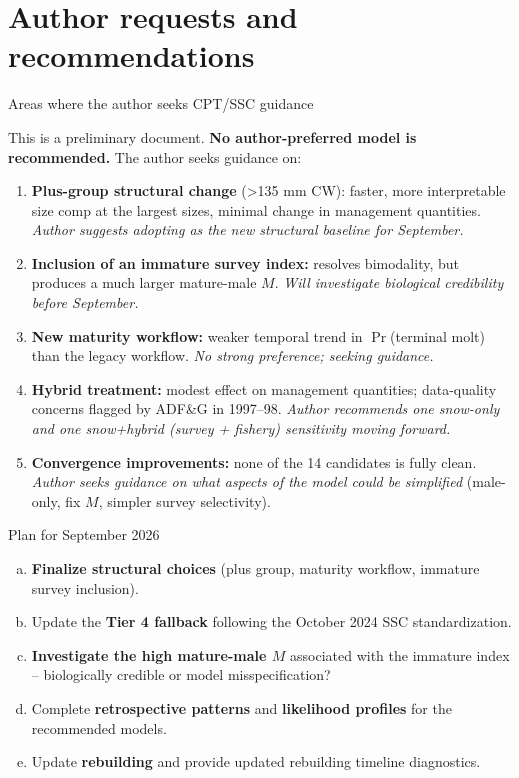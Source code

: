 \documentclass[
  10pt,
  ignorenonframetext,
  aspectratio=169,
]{beamer}
\providecommand{\tightlist}{%
  \setlength{\itemsep}{0pt}\setlength{\parskip}{0pt}}
\begin{document}
\section{Author requests and
recommendations}\label{author-requests-and-recommendations}

\begin{frame}{Areas where the author seeks CPT/SSC guidance}
\label{areas-where-the-author-seeks-cptssc-guidance}
\small

This is a preliminary document. \textbf{No author-preferred model is
recommended.} The author seeks guidance on:

\begin{enumerate}
\tightlist
\item
  \textbf{Plus-group structural change} (\textgreater135 mm CW): faster,
  more interpretable size comp at the largest sizes, minimal change in
  management quantities. \emph{Author suggests adopting as the new
  structural baseline for September.}
\item
  \textbf{Inclusion of an immature survey index:} resolves bimodality,
  but produces a much larger mature-male \(M\). \emph{Will investigate
  biological credibility before September.}
\item
  \textbf{New maturity workflow:} weaker temporal trend in
  \(\Pr\)(terminal molt) than the legacy workflow. \emph{No strong
  preference; seeking guidance.}
\item
  \textbf{Hybrid treatment:} modest effect on management quantities;
  data-quality concerns flagged by ADF\&G in 1997--98. \emph{Author
  recommends one snow-only and one snow+hybrid (survey + fishery)
  sensitivity moving forward.}
\item
  \textbf{Convergence improvements:} none of the 14 candidates is fully
  clean. \emph{Author seeks guidance on what aspects of the model could
  be simplified} (male-only, fix \(M\), simpler survey selectivity).
\end{enumerate}
\end{frame}

\begin{frame}{Plan for September 2026}
\label{plan-for-september-2026}
\small

\begin{enumerate}
[(a)]
\item
  \textbf{Finalize structural choices} (plus group, maturity workflow,
  immature survey inclusion).
\item
  Update the \textbf{Tier 4 fallback} following the October 2024 SSC
  standardization.
\item
  \textbf{Investigate the high mature-male \(M\)} associated with the
  immature index -- biologically credible or model misspecification?
\item
  Complete \textbf{retrospective patterns} and \textbf{likelihood
  profiles} for the recommended models.
\item
  Update \textbf{rebuilding} and provide updated rebuilding timeline
  diagnostics.
\end{enumerate}
\end{frame}
\end{document}
